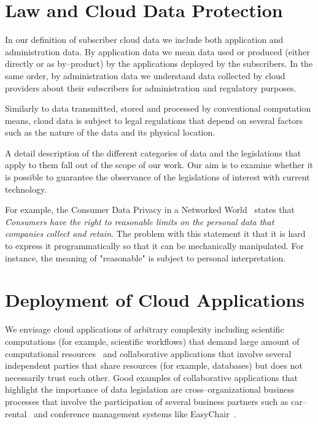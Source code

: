 \documentclass[runningheads,a4paper]{llncs}
\begin{document}
\section{Law and Cloud Data Protection}
In our definition of subscriber cloud data we include 
both application and administration data. By application data
we mean data used or produced (either directly or as
by--product) by the applications deployed
by the subscribers. In the same order, by administration data
we understand data collected by cloud providers about their
subscribers for administration and regulatory purposes.

Similarly to data transmitted, stored and processed by
conventional computation means, cloud data is subject
to legal regulations  that depend on several factors
such as the nature of the data and its physical location.

A detail description of the different categories of data and
the legislations that apply to them fall out of the scope
of our work. Our aim is to examine whether  it is 
possible to guarantee the observance of the legislations
of interest with current technology.  


For example, the Consumer Data Privacy in a Networked World~\cite{CDP2012}
states that \emph{Consumers have the right to reasonable limits on the 
personal data that companies collect and retain}. The problem with
this statement it that it is hard to express it programmatically so that
it can be mechanically manipulated. For instance, the meaning of
"reasonable" is subject to personal interpretation. 



\section{Deployment of Cloud Applications}
We envisage cloud applications of arbitrary complexity including  
scientific computations (for example, scientific workflows) that demand large amount 
of computational resources~\cite{Vecchiola2009,Deelman2008} and
collaborative applications that involve several independent
parties that share resources (for example, databases) but
does not necessarily trust each other.
Good examples of collaborative applications that highlight the
importance of data legislation are cross--organizational
business processes that involve the participation of several business 
partners such as car--rental~\cite{Aalst2011} and conference management systems like
EasyChair~\cite{Ryan2011}.
\end{document}
